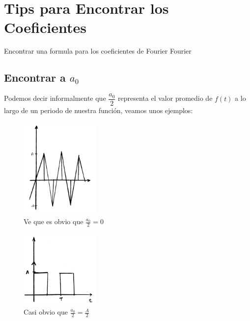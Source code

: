 \documentclass[12pt, fleqn]{report}                             %
\theoremstyle{break}                                            %
\begin{document}
                        

        \clearpage
        \section{Tips para Encontrar los Coeficientes}

            Encontrar una formula para los coeficientes de Fourier Fourier

            \subsection{Encontrar a $a_0$}

                Podemos decir informalmente que $\dfrac{a_0}{2}$ representa el valor promedio
                de $f(t)$ a lo largo de un periodo de nuestra función, veamos unos ejemplos:

                \begin{figure}[h]
                    \centering
                    \includegraphics[width=0.35\textwidth]{SerieFourierEjemplo1}
                    \caption{Ve que es obvio que $\frac{a_0}{2}=0$}
                \end{figure}

                \begin{figure}[h]
                    \centering
                    \includegraphics[width=0.35\textwidth]{SerieFourierEjemplo2}
                    \caption{Casi obvio que $\frac{a_0}{2}=\frac{A}{2}$}
                \end{figure}
                
\end{document}
